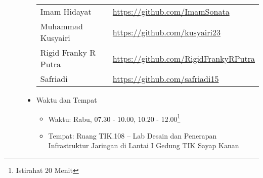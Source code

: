 \documentclass[a4paper]{tufte-handout}
\begin{document}
\begin{projects}
\begin{description}
\begin{itemize}
\begin{table}[!ht]
\begin{tabular}{ll}
Imam Hidayat			& \url{https://github.com/ImamSonata} \\
Muhammad Kusyairi		& \url{https://github.com/kusyairi23} \\
Rigid Franky R Putra	& \url{https://github.com/RigidFrankyRPutra} \\
Safriadi         		& \url{https://github.com/safriadi15} \\
\midrule
\end{tabular}
\end{table}
\item Waktu dan Tempat
\begin{itemize}
\item Waktu: Rabu, 07.30 - 10.00, 10.20 - 12.00\footnote{Istirahat 20 Menit}
\item Tempat: Ruang TIK.108 -- Lab Desain dan Penerapan Infrastruktur Jaringan di Lantai I Gedung TIK Sayap Kanan
\end{itemize}


\end{itemize}
\end{description}
\end{projects}
\end{document}
